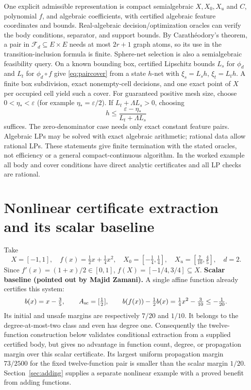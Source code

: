 \documentclass[10pt,letterpaper]{article}
\theoremstyle{remark}
\newcommand{\F}{\mathcal F_d}
\begin{document}
One explicit admissible representation is compact semialgebraic $X,X_0,X_u$ and $C$, polynomial $f$, and algebraic coefficients, with certified algebraic feature coordinates and bounds. Real-algebraic decision/optimization oracles can verify the body conditions, separator, and support bounds. By Carath\'eodory's theorem, a pair in $\F\subseteq E\times E$ needs at most $2r+1$ graph atoms, so its use in the transition-inclusion formula is finite. Sphere-net selection is also a semialgebraic feasibility query. On a known bounding box, certified Lipschitz bounds $L_s$ for $\phi_d$ and $L_t$ for $\phi_d\circ f$ give \eqref{eq:paircover} from a state $h$-net with $\xi_s=L_sh$, $\xi_t=L_th$. A finite box subdivision, exact nonempty-cell decisions, and one exact point of $X$ per occupied cell yield such a cover. For guaranteed positive mesh size, choose $0<\eta_*<\varepsilon$ (for example $\eta_*=\varepsilon/2$). If $L_t+\Lambda L_s>0$, choosing
\[
 h\leq\frac{\varepsilon-\eta_*}{L_t+\Lambda L_s}
\]
suffices. The zero-denominator case needs only exact constant feature pairs. Algebraic LPs may be solved with exact algebraic arithmetic; rational data allow rational LPs. These statements give finite termination with the stated oracles, not efficiency or a general compact-continuous algorithm. In the worked example all body and cover conditions have direct analytic certificates and all LP checks are rational.

\section{Nonlinear certificate extraction and its scalar baseline}\label{sec:nonlinear}
Take
\[
 X=[-1,1],\quad f(x)=\tfrac12x+\tfrac14x^2,\quad
 X_0=[-\tfrac14,\tfrac14],\quad X_u=[\tfrac7{10},\tfrac45],\quad d=2.
\]
Since $f'(x)=(1+x)/2\in[0,1]$, $f(X)=[-1/4,3/4]\subseteq X$.
\textbf{Scalar baseline (pointed out by Majid Zamani).}
A single affine function already certifies this system:
\[
 b(x)=x-\tfrac35,\qquad A_{\rm sc}=[\tfrac12],\qquad
 b(f(x))-\tfrac12 b(x)=\tfrac14x^2-\tfrac3{10}\leq-\tfrac1{20}.
\]
Its initial and unsafe margins are respectively $7/20$ and $1/10$.
It belongs to the degree-at-most-two class and even has degree one.
Consequently the twelve-function construction below validates conditional extraction from a supplied certified body, but gives no advantage in function count, degree, or propagation margin over this scalar certificate. Its largest uniform propagation margin $73/2500$ for the fixed twelve-function pair is smaller than the scalar margin $1/20$. Section~\ref{sec:adding} supplies a separate nonlinear example with a proved benefit from adding functions.
\end{document}
